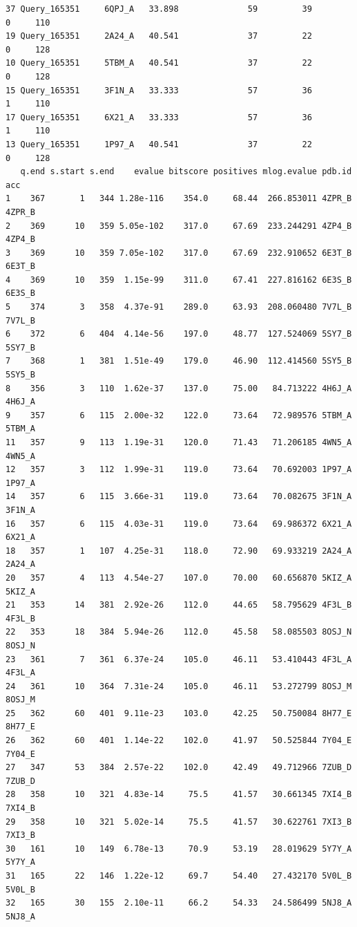 \documentclass[
  letterpaper,
  DIV=11,
  numbers=noendperiod]{scrartcl}
\begin{document}
\begin{verbatim}
37 Query_165351     6QPJ_A   33.898              59         39        0     110
19 Query_165351     2A24_A   40.541              37         22        0     128
10 Query_165351     5TBM_A   40.541              37         22        0     128
15 Query_165351     3F1N_A   33.333              57         36        1     110
17 Query_165351     6X21_A   33.333              57         36        1     110
13 Query_165351     1P97_A   40.541              37         22        0     128
   q.end s.start s.end    evalue bitscore positives mlog.evalue pdb.id    acc
1    367       1   344 1.28e-116    354.0     68.44  266.853011 4ZPR_B 4ZPR_B
2    369      10   359 5.05e-102    317.0     67.69  233.244291 4ZP4_B 4ZP4_B
3    369      10   359 7.05e-102    317.0     67.69  232.910652 6E3T_B 6E3T_B
4    369      10   359  1.15e-99    311.0     67.41  227.816162 6E3S_B 6E3S_B
5    374       3   358  4.37e-91    289.0     63.93  208.060480 7V7L_B 7V7L_B
6    372       6   404  4.14e-56    197.0     48.77  127.524069 5SY7_B 5SY7_B
7    368       1   381  1.51e-49    179.0     46.90  112.414560 5SY5_B 5SY5_B
8    356       3   110  1.62e-37    137.0     75.00   84.713222 4H6J_A 4H6J_A
9    357       6   115  2.00e-32    122.0     73.64   72.989576 5TBM_A 5TBM_A
11   357       9   113  1.19e-31    120.0     71.43   71.206185 4WN5_A 4WN5_A
12   357       3   112  1.99e-31    119.0     73.64   70.692003 1P97_A 1P97_A
14   357       6   115  3.66e-31    119.0     73.64   70.082675 3F1N_A 3F1N_A
16   357       6   115  4.03e-31    119.0     73.64   69.986372 6X21_A 6X21_A
18   357       1   107  4.25e-31    118.0     72.90   69.933219 2A24_A 2A24_A
20   357       4   113  4.54e-27    107.0     70.00   60.656870 5KIZ_A 5KIZ_A
21   353      14   381  2.92e-26    112.0     44.65   58.795629 4F3L_B 4F3L_B
22   353      18   384  5.94e-26    112.0     45.58   58.085503 8OSJ_N 8OSJ_N
23   361       7   361  6.37e-24    105.0     46.11   53.410443 4F3L_A 4F3L_A
24   361      10   364  7.31e-24    105.0     46.11   53.272799 8OSJ_M 8OSJ_M
25   362      60   401  9.11e-23    103.0     42.25   50.750084 8H77_E 8H77_E
26   362      60   401  1.14e-22    102.0     41.97   50.525844 7Y04_E 7Y04_E
27   347      53   384  2.57e-22    102.0     42.49   49.712966 7ZUB_D 7ZUB_D
28   358      10   321  4.83e-14     75.5     41.57   30.661345 7XI4_B 7XI4_B
29   358      10   321  5.02e-14     75.5     41.57   30.622761 7XI3_B 7XI3_B
30   161      10   149  6.78e-13     70.9     53.19   28.019629 5Y7Y_A 5Y7Y_A
31   165      22   146  1.22e-12     69.7     54.40   27.432170 5V0L_B 5V0L_B
32   165      30   155  2.10e-11     66.2     54.33   24.586499 5NJ8_A 5NJ8_A

\end{verbatim}
\end{document}
